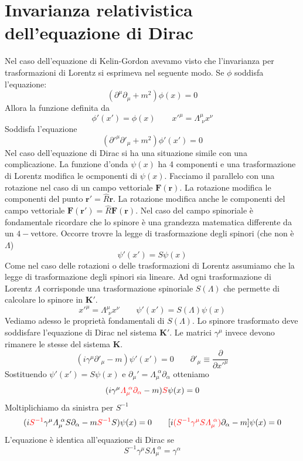 \section{Invarianza relativistica dell'equazione di Dirac}
Nel caso dell'equazione di Kelin-Gordon avevamo visto che l'invarianza per trasformazioni di Lorentz si esprimeva nel seguente modo. Se $\phi$ soddisfa l'equazione:
$$
(\partial^\mu \partial_\mu + m^2)\phi(x) = 0
$$
Allora la funzione definita da 
$$
\phi'(x') = \phi(x) \qquad x'^\mu = \Lambda^\mu_{\,\,\nu} x^\nu
$$
Soddisfa l'equazione
$$
(\partial'^\mu \partial'_\mu + m^2)\phi'(x') = 0
$$
Nel caso dell'equazione di Dirac si ha una situazione simile con una complicazione. La funzione d'onda $\psi(x)$ ha 4 componenti e una trasformazione di Lorentz modifica le ocmponenti di $\psi(x)$. Facciamo il parallelo con una rotazione nel caso di un campo vettoriale $\mathbf{F}(\mathbf{r})$. La rotazione modifica le componenti del punto $\mathbf{r}'=\hat{R}\mathbf{r}$. La rotazione modifica anche le componenti del campo vettoriale $\mathbf{F}(\mathbf{r}')=\hat{R}\mathbf{F}(\mathbf{r})$. Nel caso del campo spinoriale è fondamentale ricordare che lo spinore è una grandezza matematica differente da un $4-$vettore. Occorre trovre la legge di trasformazione degli spinori (che non è $\Lambda$)
$$
\psi'(x') = S\psi(x)
$$
Come nel caso delle rotazioni o delle trasformazioni di Lorentz assumiamo che la legge di trasformazione degli spinori sia lineare. Ad ogni trasformazione di Lorentz $\Lambda$ corrisponde una trasformazione spinoriale $S(\Lambda)$ che permette di calcolare lo spinore in $\mathbf{K}'$.
$$
x'^\mu = \Lambda^\mu_{\,\,\nu} x^\nu \qquad \psi'(x') = S(\Lambda)\psi(x)
$$
Vediamo adesso le proprietà fondamentali di $S(\Lambda)$. Lo spinore trasformato deve soddisfare l'equazione di Dirac nel sistema $\mathbf{K}'$. Le matrici $\gamma^\mu$ invece devono rimanere le stesse del sistema $\mathbf{K}$.
$$
(i\gamma^\mu \partial'_\mu - m)\psi'(x') = 0 \qquad \partial'_\mu \equiv \frac{\partial}{\partial x'^\mu}
$$
Sostituendo $\psi'(x')=S\psi(x)$ e $\partial_\mu'=\Lambda_\mu^{\,\,\alpha}\partial_\alpha$ otteniamo
$$
(i\gamma^\mu \textcolor{red}{\Lambda_\mu^{\,\,\alpha} \partial_\alpha} - m) \textcolor{red}{S}\psi(x) = 0
$$
Moltiplichiamo da sinistra per $S^{-1}$
$$
(i\textcolor{red}{S^{-1}}\gamma^\mu \Lambda_\mu^{\,\,\alpha} S \partial_\alpha - m\textcolor{red}{S^{-1}}S)\psi(x) = 0 \qquad [i\textcolor{red}{(S^{-1}\gamma^\mu S \Lambda_\mu^{\,\,\alpha})} \partial_\alpha - m]\psi(x) = 0
$$
L'equazione è identica all'equazione di Dirac se
$$
S^{-1}\gamma^\mu S \Lambda_\mu^{\,\,\alpha} = \gamma^\alpha
$$
